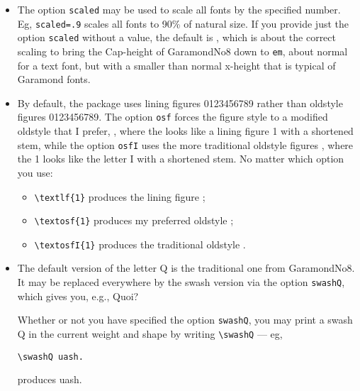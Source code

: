 \documentclass[11pt]{article}
\begin{document}
\begin{itemize}
\item
The option \texttt{scaled} may be used to scale all fonts by the specified number. Eg, \texttt{scaled=.9} scales all fonts to 90\% of natural size. If you provide just the option \texttt{scaled} without a value, the default is , which is about the correct scaling to bring the Cap-height of GaramondNo8 down to \texttt{em}, about normal for a text font, but with a  smaller than normal  x-height that is typical of Garamond fonts.
\item
By default, the package uses lining figures { 0123456789} rather than oldstyle figures 0123456789. The option \texttt{osf} forces the figure style to a modified oldstyle that I prefer, , where the  looks like a lining figure { 1} with a shortened stem, while the option \texttt{osfI} uses the more traditional oldstyle figures , where the 1 looks like the letter I with a shortened stem. No matter which option you use:
\begin{itemize}
\item
\verb|\textlf{1}| produces the lining figure ;
\item \verb|\textosf{1}| produces my preferred oldstyle ;
\item \verb|\textosfI{1}| produces the traditional oldstyle .
\end{itemize}
\item The default version of the letter Q is the traditional one from GaramondNo8. It may be replaced everywhere by the swash version via the option \texttt{swashQ}, which gives you, e.g., 
{\sq Q}uoi?

Whether or not you have specified the option \texttt{swashQ}, you may print a swash Q in the current weight and shape by writing \verb|\swashQ| --- eg, 
\begin{verbatim}
\swashQ uash.
\end{verbatim}
produces \swashQ uash.
\end{itemize}
\end{document}
